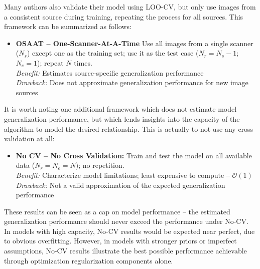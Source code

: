 Many authors also validate their model using LOO-CV,
but only use images from a consistent source during training,
repeating the process for all sources.
This framework can be summarized as follows:
\begin{itemize}
  \item\textbf{OSAAT -- One-Scanner-At-A-Time}
  Use all images from a single scanner ($N_s$) except one as the training set;
  use it as the test case ($N_r = N_s-1$; $N_e = 1$);
  repeat $N$ times.
  \\\textit{Benefit:} Estimates source-specific generalization performance
  \\\textit{Drawback:} Does not approximate generalization performance for new image sources
\end{itemize}
\par
It is worth noting one additional framework which
does not estimate model generalization performance,
but which lends insights into the capacity of the algorithm
to model the desired relationship.
This is actually to not use any cross validation at all:
\begin{itemize}
  \item\textbf{No CV -- No Cross Validation:}
  Train and test the model on all available data ($N_r = N_e = N$);
  no repetition.
  \\\textit{Benefit:} Characterize model limitations; least expensive to compute -- $\mathcal{O}(1)$
  \\\textit{Drawback:} Not a valid approximation of the expected generalization performance
\end{itemize}
These results can be seen as a cap on model performance
-- the estimated generalization performance should never exceed the performance under No-CV.
In models with high capacity, No-CV results would be expected near perfect,
due to obvious overfitting.
However, in models with stronger priors or imperfect assumptions,
No-CV results illustrate the best possible performance achievable
through optimization regularization components alone.
